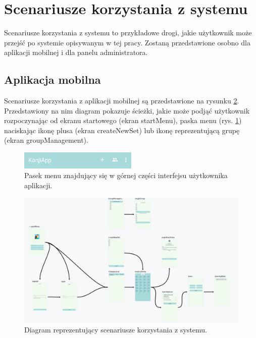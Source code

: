 \documentclass[a4paper,twoside,12pt]{book}
\begin{document}
\section{Scenariusze korzystania z systemu}

Scenariusze korzystania z systemu to przykładowe drogi, jakie użytkownik może przejść po systemie opisywanym w tej pracy. Zostaną przedstawione osobno dla aplikacji mobilnej i dla panelu administratora.

\subsection{Aplikacja mobilna}

Scenariusze korzystania z aplikacji mobilnej są przedstawione na rysunku \ref{fig:navgraph}. Przedstawiony na nim diagram pokazuje ścieżki, jakie może podjąć użytkownik rozpoczynając od ekranu startowego (ekran startMenu), paska menu (rys. \ref{fig:menu}) naciskając ikonę plusa (ekran createNewSet) lub ikonę reprezentującą grupę (ekran groupManagement). 

\begin{figure}[]
\centering
\includegraphics[width=0.5\textwidth]{menu}
\caption{Pasek menu znajdujący się w górnej części interfejsu użytkownika aplikacji.}
\label{fig:menu}
\end{figure}

\begin{figure}[]
\centering
\includegraphics[width=\textwidth]{Navgraph}
\caption{Diagram reprezentujący scenariusze korzystania z systemu.}
\label{fig:navgraph}
\end{figure}
\end{document}
